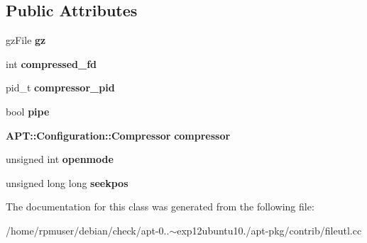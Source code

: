 \subsection*{\-Public \-Attributes}
\begin{DoxyCompactItemize}
\item 
gz\-File {\bfseries gz}\label{classFileFdPrivate_a3f64f8c1071dc4699b64f375ee1cd9f6}

\item 
int {\bfseries compressed\-\_\-fd}\label{classFileFdPrivate_afc2bbf0ae34544487358d9fbad6ed703}

\item 
pid\-\_\-t {\bfseries compressor\-\_\-pid}\label{classFileFdPrivate_ae42664a06a56dbcdda6d53cb81c3250f}

\item 
bool {\bfseries pipe}\label{classFileFdPrivate_a2b92649478c417988f390ef5e865bb2d}

\item 
{\bf \-A\-P\-T\-::\-Configuration\-::\-Compressor} {\bfseries compressor}\label{classFileFdPrivate_a130ebb4ca5e553e5acb9defdddf8272d}

\item 
unsigned int {\bfseries openmode}\label{classFileFdPrivate_a8b503e7e54ce041526dc7ab0305871db}

\item 
unsigned long long {\bfseries seekpos}\label{classFileFdPrivate_ab5d2c6998849e8cf76a581cd920e9583}

\end{DoxyCompactItemize}


\-The documentation for this class was generated from the following file\-:\begin{DoxyCompactItemize}
\item 
/home/rpmuser/debian/check/apt-\/0..$\sim$exp12ubuntu10./apt-\/pkg/contrib/fileutl.\-cc\end{DoxyCompactItemize}
